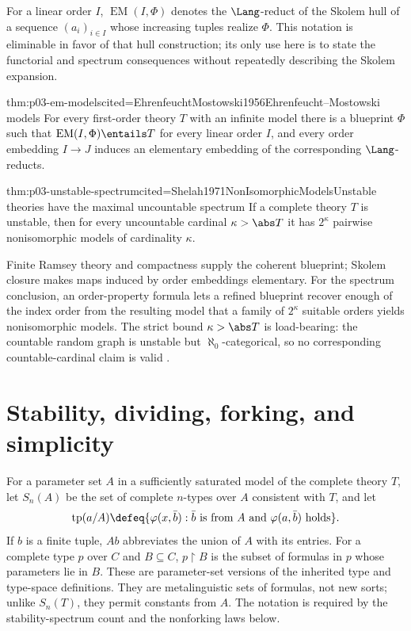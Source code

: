 For a linear order \(I\), \(\operatorname{EM}(I,\Phi)\) denotes the
\(\Lang\)-reduct of the Skolem hull of a sequence
\((a_i)_{i\in I}\) whose increasing tuples realize \(\Phi\).  This notation
is eliminable in favor of that hull construction; its only use here is to
state the functorial and spectrum consequences without repeatedly describing
the Skolem expansion.

\begin{hbtheorem}{thm:p03-em-models}{cited=EhrenfeuchtMostowski1956}{Ehrenfeucht--Mostowski models}
For every first-order theory \(T\) with an infinite model there is a blueprint
\(\Phi\) such that \(\operatorname{EM}(I,\Phi)\entails T\) for every linear
order \(I\), and every order embedding \(I\to J\) induces an elementary
embedding of the corresponding \(\Lang\)-reducts.
\end{hbtheorem}

\begin{hbtheorem}{thm:p03-unstable-spectrum}{cited=Shelah1971NonIsomorphicModels}{Unstable theories have the maximal uncountable spectrum}
If a complete theory \(T\) is unstable, then for every uncountable cardinal
\(\kappa>\abs T\) it has \(2^\kappa\) pairwise nonisomorphic models of
cardinality \(\kappa\).
\end{hbtheorem}

Finite Ramsey theory and compactness supply the coherent blueprint; Skolem
closure makes maps induced by order embeddings elementary.  For the spectrum
conclusion, an order-property formula lets a refined blueprint recover enough
of the index order from the resulting model that a family of
\(2^\kappa\) suitable orders yields nonisomorphic models.  The strict bound
\(\kappa>\abs T\) is load-bearing: the countable random graph is unstable but
\(\aleph_0\)-categorical, so no corresponding countable-cardinal claim is
valid \cite{EhrenfeuchtMostowski1956,Shelah1971NonIsomorphicModels,Hodges1993}.

\section{Stability, dividing, forking, and simplicity}
\label{sec:p03-stability}

For a parameter set \(A\) in a sufficiently saturated model of the complete
theory \(T\), let \(S_n(A)\) be the set of complete \(n\)-types over \(A\)
consistent with \(T\), and let
\[
\operatorname{tp}(a/A)
\defeq\{\varphi(x,\bar b):\bar b\text{ is from }A
              \text{ and }\varphi(a,\bar b)\text{ holds}\}.
\]
If \(b\) is a finite tuple, \(Ab\) abbreviates the union of \(A\) with its
entries.  For a complete type \(p\) over \(C\) and \(B\subseteq C\),
\(p\mathbin{\upharpoonright}B\) is the subset of formulas in \(p\) whose
parameters lie in \(B\).
These are parameter-set versions of the inherited type and type-space
definitions.  They are metalinguistic sets of formulas, not new sorts; unlike
\(S_n(T)\), they permit constants from \(A\).  The notation is required by
the stability-spectrum count and the nonforking laws below.

